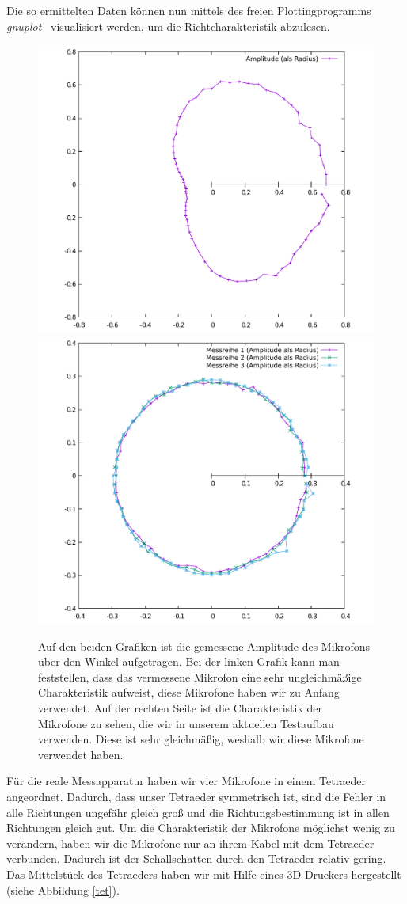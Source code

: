 Die so ermittelten Daten können nun mittels des freien Plottingprogramms \textit{gnuplot}~\cite{Gnuplot} visualisiert werden, um die Richtcharakteristik abzulesen.
\begin{figure}[H]
  \centering
  \includegraphics[width=0.45\linewidth]{img/badMic}
  \includegraphics[width=0.45\linewidth]{img/goodMic}
  \caption{Auf den beiden Grafiken ist die gemessene Amplitude des Mikrofons über den Winkel aufgetragen. Bei der linken Grafik kann man feststellen, dass das vermessene Mikrofon eine sehr ungleichmäßige Charakteristik aufweist, diese Mikrofone haben wir zu Anfang verwendet. Auf der rechten Seite ist die Charakteristik der Mikrofone zu sehen, die wir in unserem aktuellen Testaufbau verwenden. Diese ist sehr gleichmäßig, weshalb wir diese Mikrofone verwendet haben.}\label{fig:caracter}
\end{figure}
Für die reale Messapparatur haben wir vier Mikrofone in einem Tetraeder angeordnet. Dadurch, dass unser Tetraeder symmetrisch ist, sind die Fehler in alle Richtungen ungefähr gleich groß und die Richtungsbestimmung ist in allen Richtungen gleich gut. Um die Charakteristik der Mikrofone möglichst wenig zu verändern, haben wir die Mikrofone nur an ihrem Kabel mit dem Tetraeder verbunden. Dadurch ist der Schallschatten durch den Tetraeder relativ gering. Das Mittelstück des Tetraeders haben wir mit Hilfe eines 3D-Druckers hergestellt (siehe Abbildung \ref{tet}).
